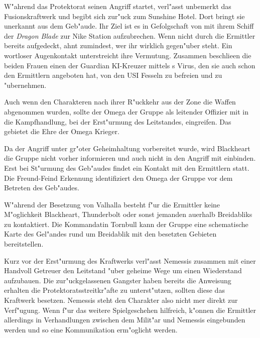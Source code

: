 W"ahrend das Protektorat seinen Angriff startet, verl"asst \xl{} unbemerkt das Fusionskraftwerk und begibt sich zur"uck zum Sunshine Hotel. Dort bringt sie \ml{} unerkannt aus dem Geb"aude. Ihr Ziel ist es in Gefolgschaft von \ml{} mit ihrem Schiff der \emph{Dragon Blade} zur Nike Station aufzubrechen. Wenn nicht durch die Ermittler bereits aufgedeckt, ahnt \ml{} zumindest, wer ihr wirklich gegen"uber steht. Ein wortloser Augenkontakt unterstreicht ihre Vermutung. Zusammen beschlie\3en die beiden Frauen einen der Guardian KI-Kreuzer mittels \ml{}s Virus, den sie auch schon den Ermittlern angeboten hat, von den USI Fesseln zu befreien und zu "ubernehmen. 

\begin{remarks}
	Auch wenn den Charakteren nach ihrer R"uckkehr aus der Zone die Waffen abgenommen wurden, sollte der Omega der Gruppe als leitender Offizier mit in die Kampfhandlung, bei der Erst"urmung des Leitstandes, eingreifen. Das gebietet die Ehre der Omega Krieger.
	
	Da der Angriff unter gr"o\3ter Geheimhaltung vorbereitet wurde, wird Blackheart die Gruppe nicht vorher informieren und auch nicht in den Angriff mit einbinden. Erst bei St"urmung des Geb"audes findet ein Kontakt mit den Ermittlern statt. Die Freund-Feind Erkennung identifiziert den Omega der Gruppe vor dem Betreten des Geb"audes. 
	
	W"ahrend der Besetzung von Valhalla besteht f"ur die Ermittler keine M"oglichkeit Blackheart, Thunderbolt oder sonst jemanden au\3erhalb Breidabliks zu kontaktiert. Die Kommandatin Tornbull kann der Gruppe eine schematische Karte des Gel"andes rund um Breidablik mit den besetzten Gebieten bereitstellen.

	Kurz vor der Erst"urmung des Kraftwerks verl"asst Nemessis zusammen mit einer Handvoll Getreuer den Leitstand "uber geheime Wege um einen Wiederstand aufzubauen. Die zur"uckgelassenen Gangster haben bereits die Anweisung erhalten die Protektoratsstreitkr"afte zu unterst"utzen, sollten diese das Kraftwerk besetzen. Nemessis steht den Charakter also nicht mer direkt zur Verf"ugung. Wenn f"ur das weitere Spielgeschehen hilfreich, k"onnen die Ermittler allerdings in Verhandlungen zwischen dem Milit"ar und Nemessis eingebunden werden und so eine Kommunikation erm"oglicht werden. 
\end{remarks}
